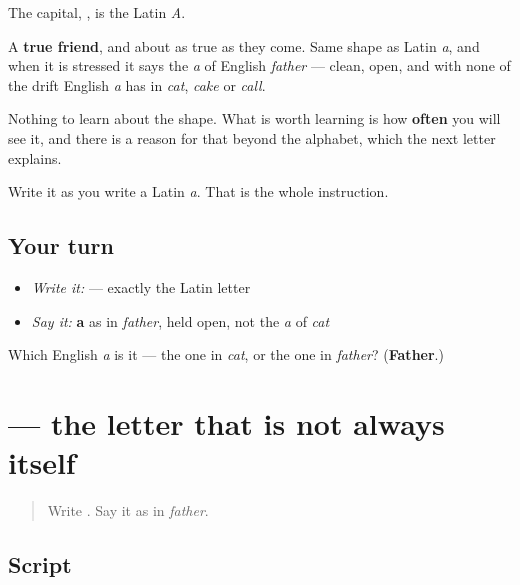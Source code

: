 The capital, \textbf{}, is the Latin \emph{A}.

A \textbf{true friend}, and about as true as they come. Same shape as Latin \emph{a}, and when it is stressed it says the \emph{a} of English \emph{father} — clean, open, and with none of the drift English \emph{a} has in \emph{cat}, \emph{cake} or \emph{call}.

Nothing to learn about the shape. What is worth learning is how \textbf{often} you will see it, and there is a reason for that beyond the alphabet, which the next letter explains.

Write it as you write a Latin \emph{a}. That is the whole instruction.

\subsection*{Your turn}
\begin{itemize}
\raggedright
  \item \emph{Write it:}  — exactly the Latin letter
  \item \emph{Say it:} \textbf{a} as in \emph{father}, held open, not the \emph{a} of \emph{cat}
\end{itemize}

\begin{tcolorbox}[breakable,colback=teal!4,colframe=teal!35!black,title={Before you move on}]
Which English \emph{a} is it — the one in \emph{cat}, or the one in \emph{father}? (\textbf{Father}.)
\end{tcolorbox}
\section[\texorpdfstring{\ru{о} (o)}{о (o)}]{ — the letter that is not always itself}

\label{lesson:RU-W07-o}



\begin{quote}
Write . Say it as in \emph{father}.
\end{quote}

\subsection*{Script}

\begin{quote}
   
\end{quote}

